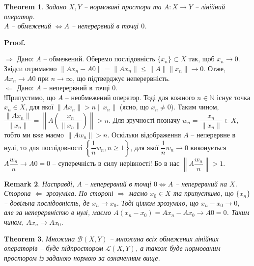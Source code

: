 \documentclass[a4paper, 10pt]{article}
\makeatletter
\def\rightproof{$\boxed{\Rightarrow}$ }
\def\leftproof{$\boxed{\Leftarrow}$ }
\theoremstyle{theoremdd}
\newtheorem{theorem}{Theorem}[subsection]
\theoremstyle{theoremdd}
\theoremstyle{theoremdd}
\theoremstyle{theoremdd}
\theoremstyle{theoremdd}
\theoremstyle{theoremdd}
\newtheorem{remark}[theorem]{Remark}
\theoremstyle{theoremdd}
\theoremstyle{theoremdd}
\renewenvironment{proof}[1][Proof.\\]{\par
\pushQED{\hfill \qed}%
\normalfont \topsep6\p@\@plus6\p@\relax
\trivlist
\item\relax
{\bfseries
#1\@addpunct{.}}\hspace\labelsep\ignorespaces
}{%
\popQED\endtrivlist\@endpefalse
}
\makeatother
\begin{document}
\begin{theorem}
Задано $X,Y$ -- нормовані простори та $A \colon X \to Y$ -- лінійний оператор.\\
$A$ -- обмежений $\iff A $ -- неперервний в точці $0$.
\end{theorem}

\begin{proof}
\rightproof Дано: $A$ -- обмежений. Оберемо послідовність $\{x_n\} \subset X$ так, щоб $x_n \to 0$. Звідси отримаємо $\|Ax_n - A0\| = \|Ax_n\| \leq \|A\| \|x_n\| \to 0$. Отже, $Ax_n \to A0$ при $n \to \infty$, що підтверджує неперервність. 
\bigskip \\
\leftproof Дано: $A$ -- неперервний в точці $0$.\\
!Припустимо, що $A$ -- необмежений оператор. Тоді для кожного $n \in \mathbb{N}$ існує точка $x_n \in X$, для якої $\|Ax_n\| > n \|x_n\|$ (ясно, що $x_n \neq 0$).  Таким чином, $\dfrac{\|Ax_n\|}{\|x_n\|} = \left\| A\left( \dfrac{x_n}{\|x_n\|} \right) \right\| > n$. Для зручності позначу $w_n = \dfrac{x_n}{\|x_n\|} \in X$, тобто ми вже маємо $\| Aw_n\| > n$. Оскільки відображення $A$ -- неперервне в нулі, то для послідовності $\left\{ \dfrac{1}{n}w_n, n \geq 1 \right\}$, для якої $\dfrac{1}{n} w_n \to 0$ виконується $A \dfrac{w_n}{n} \to A0 = 0$ -- суперечність в силу нерівності! Бо в нас $\left\| A \dfrac{w_n}{n} \right\| > 1$.
\end{proof}

\begin{remark}
Насправді, $A$ -- неперервний в точці $0 \iff A$ -- неперервний на $X$.\\
Сторона \leftproof зрозуміла. По стороні \rightproof маємо $x_0 \in X$ та припустимо, що $\{x_n\}$ -- довільна послідовність, де $x_n \to x_0$. Тоді цілком зрозуміло, що $x_n - x_0 \to 0$, але за неперервністю в нулі, маємо $A(x_n - x_0) = A x_n - A x_0 \to A0 = 0$. Таким чином, $A x_n \to A x_0$.
\end{remark}

\begin{theorem}
Множина $\mathcal{B}(X,Y)$ -- множина всіх обмежених лінійних операторів -- буде підпростором $\mathcal{L}(X,Y)$, а також буде нормованим простором із заданою нормою за означенням вище.
\end{theorem}
\end{document}
